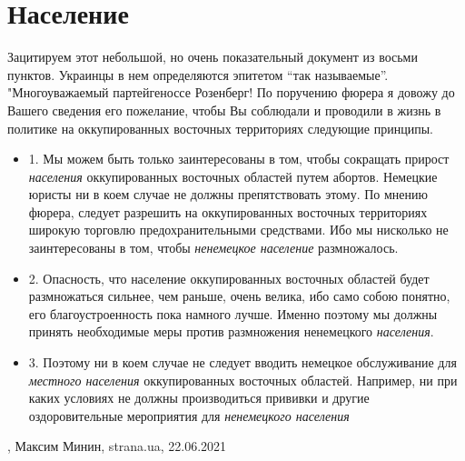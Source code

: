  
 
 
 
 
\chapter{Население}
\label{sec:slova.naselenie}

Зацитируем этот небольшой, но очень показательный документ из восьми пунктов.
Украинцы в нем определяются эпитетом \enquote{так называемые}. 
"Многоуважаемый партейгеноссе Розенберг!
По поручению фюрера я довожу до Вашего сведения его пожелание, чтобы Вы
соблюдали и проводили в жизнь в политике на оккупированных восточных
территориях следующие принципы.
\begin{itemize}
\item 1. Мы можем быть только заинтересованы в том, чтобы сокращать прирост \emph{населения}
оккупированных восточных областей путем абортов. Немецкие юристы ни в коем
случае не должны препятствовать этому. По мнению фюрера, следует разрешить на
оккупированных восточных территориях широкую торговлю предохранительными
средствами. Ибо мы нисколько не заинтересованы в том, чтобы \emph{ненемецкое
население} размножалось.
\item 2. Опасность, что население оккупированных восточных областей будет
размножаться сильнее, чем раньше, очень велика, ибо само собою понятно, его
благоустроенность пока намного лучше. Именно поэтому мы должны принять
необходимые меры против размножения ненемецкого \emph{населения}.
\item 3. Поэтому ни в коем случае не следует вводить немецкое обслуживание для
\emph{местного населения} оккупированных восточных областей. Например, ни при каких
условиях не должны производиться прививки и другие оздоровительные мероприятия
для \emph{ненемецкого населения}
\end{itemize}
  , Максим Минин, strana.ua, 22.06.2021


